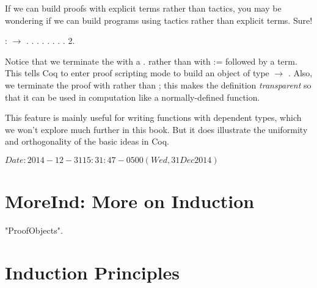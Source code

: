 \documentclass[12pt]{report}
\begin{document}
 If we can build proofs with explicit terms rather than tactics,
    you may be wondering if we can build programs using tactics rather
    than explicit terms.  Sure! \begin{coqdoccode}
\coqdocemptyline
\coqdocnoindent
{}  :  \ensuremath{\rightarrow} .\coqdoceol
\coqdocnoindent
{} .\coqdoceol
\coqdocnoindent
{} .\coqdoceol
\coqdocnoindent
{} .\coqdoceol
\coqdocnoindent
{} .\coqdoceol
\coqdocnoindent
{} . .\coqdoceol
\coqdocemptyline
\coqdocnoindent
{} .\coqdoceol
\coqdocemptyline
\coqdocnoindent
{}    2.\coqdoceol
\coqdocemptyline
\end{coqdoccode}
Notice that we terminate the  with a . rather than with
:= followed by a term.  This tells Coq to enter proof scripting mode
to build an object of type  \ensuremath{\rightarrow} .  Also, we terminate the proof
with  rather than ; this makes the definition \textit{transparent}
so that it can be used in computation like a normally-defined function.  


This feature is mainly useful for writing functions with dependent types,
which we won't explore much further in this book.
But it does illustrate the uniformity and orthogonality of the basic ideas in Coq. 

 $Date: 2014-12-31 15:31:47 -0500 (Wed, 31 Dec 2014) $ \begin{coqdoccode}
\coqdocemptyline
\end{coqdoccode}

\begin{coqdoccode}
\end{coqdoccode}
\section{MoreInd: More on Induction}

\begin{coqdoccode}
\coqdocemptyline
\coqdocnoindent
{}  "ProofObjects".\coqdoceol
\coqdocemptyline
\end{coqdoccode}
\section{Induction Principles}
\end{document}
